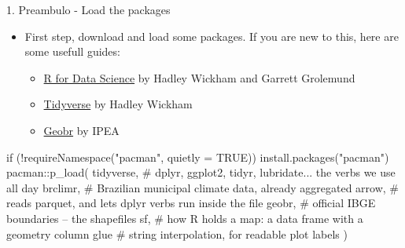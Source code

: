 \documentclass[aspectratio=169,10pt]{beamer}
\begin{document}
\begin{frame}[fragile]{1. Preambulo - Load the packages}

\begin{itemize}
  \setlength{\itemsep}{0pt}
  \item First step, download and load some packages. If you are new to this, here are some usefull guides:
  \begin{itemize}
  \setlength{\itemsep}{0pt}
  \item \href{https://r4ds.had.co.nz/}{R for Data Science} by Hadley Wickham and Garrett Grolemund
  \item \href{https://tidyverse.org/}{Tidyverse} by Hadley Wickham
  \item \href{https://github.com/ipea/geobr}{Geobr} by IPEA
\end{itemize}
\end{itemize}

\vspace{-10pt}
\begin{Rcode}
if (!requireNamespace("pacman", quietly = TRUE)) install.packages("pacman")
pacman::p_load(
  tidyverse,    # dplyr, ggplot2, tidyr, lubridate... the verbs we use all day
  brclimr,      # Brazilian municipal climate data, already aggregated
  arrow,        # reads parquet, and lets dplyr verbs run inside the file
  geobr,        # official IBGE boundaries -- the shapefiles
  sf,           # how R holds a map: a data frame with a geometry column
  glue          # string interpolation, for readable plot labels
)
\end{Rcode}
\end{frame}
\end{document}
